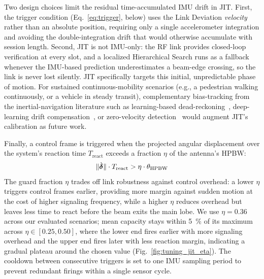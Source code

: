 \documentclass[fleqn,10pt]{wlscirep}
\newcommand{\rev}[1]{{\color{revblue}#1}}
\begin{document}
\rev{Two design choices limit the residual time-accumulated IMU drift in JIT. First, the trigger condition (Eq.~\ref{eq:trigger}, below) uses the Link Deviation \emph{velocity} rather than an absolute position, requiring only a single accelerometer integration and avoiding the double-integration drift that would otherwise accumulate with session length. Second, JIT is not IMU-only: the RF link provides closed-loop verification at every slot, and a localized Hierarchical Search runs as a fallback whenever the IMU-based prediction underestimates a beam-edge crossing, so the link is never lost silently. JIT specifically targets this initial, unpredictable phase of motion. For sustained continuous-mobility scenarios (e.g., a pedestrian walking continuously, or a vehicle in steady transit), complementary bias-tracking from the inertial-navigation literature such as learning-based dead-reckoning~\cite{Brossard2020AIIMU}, deep-learning drift compensation~\cite{Chen2024DLInertial}, or zero-velocity detection~\cite{Skog2010ZUPT} would augment JIT's calibration as future work.}

Finally, a control frame is triggered when the projected angular displacement over the system's reaction time $T_{\text{react}}$ exceeds a fraction $\eta$ of the antenna's HPBW:
\begin{equation}
    \|\dot{\boldsymbol{\delta}}\| \cdot T_{\text{react}} > \eta \cdot \theta_{\text{HPBW}}
    \rev{\label{eq:trigger}}
\end{equation}
The guard fraction $\eta$ trades off link robustness against control overhead: a lower $\eta$ triggers control frames earlier, providing more margin against sudden motion at the cost of higher signaling frequency, while a higher $\eta$ reduces overhead but leaves less time to react before the beam exits the main lobe. We use $\eta = 0.36$ across our evaluated scenarios; \rev{mean capacity stays within \SI{5}{\percent} of its maximum across $\eta \in [0.25, 0.50]$, where the lower end fires earlier with more signaling overhead and the upper end fires later with less reaction margin, indicating a gradual plateau around the chosen value (Fig.~\ref{fig:tuning_jit_eta}). The cooldown between consecutive triggers is set to one IMU sampling period to prevent redundant firings within a single sensor cycle.}
\end{document}

